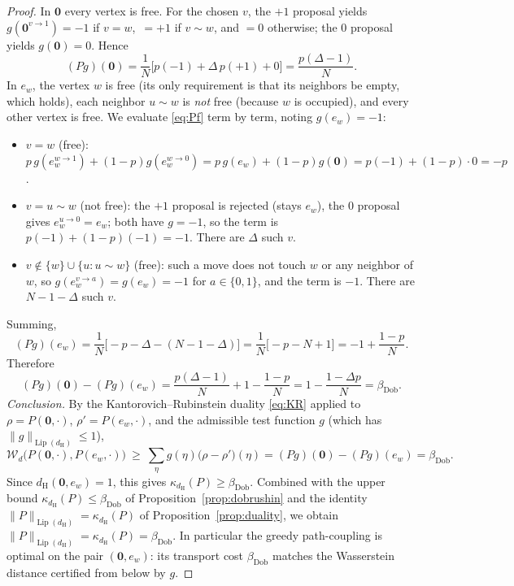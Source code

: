 \documentclass{amsart}
\DeclareMathOperator{\Lip}{Lip}
\newcommand{\Wd}{\mathcal{W}_d}
\begin{document}
\begin{proof}
In $\mathbf 0$ every vertex is free. For the chosen $v$, the $+1$ proposal yields
$g(\mathbf 0^{v\to1})=-1$ if $v=w$, $\,=+1$ if $v\sim w$, and $=0$ otherwise; the
$0$ proposal yields $g(\mathbf 0)=0$. Hence
\[
(Pg)(\mathbf 0)=\frac1N\Big[p(-1)+\Delta\,p(+1)+0\Big]=\frac{p(\Delta-1)}{N}.
\]
In $e_w$, the vertex $w$ is free (its only requirement is that its neighbors be
empty, which holds), each neighbor $u\sim w$ is \emph{not} free (because $w$ is
occupied), and every other vertex is free. We evaluate \eqref{eq:Pf} term by
term, noting $g(e_w)=-1$:
\begin{itemize}
\item $v=w$ (free): $p\,g(e_w^{w\to1})+(1-p)g(e_w^{w\to0})
=p\,g(e_w)+(1-p)g(\mathbf 0)=p(-1)+(1-p)\cdot0=-p$.
\item $v=u\sim w$ (not free): the $+1$ proposal is rejected (stays $e_w$), the
$0$ proposal gives $e_w^{u\to0}=e_w$; both have $g=-1$, so the term is
$p(-1)+(1-p)(-1)=-1$. There are $\Delta$ such $v$.
\item $v\notin\{w\}\cup\{u:u\sim w\}$ (free): such a move does not touch $w$ or
any neighbor of $w$, so $g(e_w^{v\to a})=g(e_w)=-1$ for $a\in\{0,1\}$, and the
term is $-1$. There are $N-1-\Delta$ such $v$.
\end{itemize}
Summing,
\[
(Pg)(e_w)=\frac1N\Big[-p-\Delta-(N-1-\Delta)\Big]
=\frac1N\big[-p-N+1\big]=-1+\frac{1-p}{N}.
\]
Therefore
\[
(Pg)(\mathbf 0)-(Pg)(e_w)
=\frac{p(\Delta-1)}{N}+1-\frac{1-p}{N}
=1-\frac{1-\Delta p}{N}=\beta_{\mathrm{Dob}} .
\]
\emph{Conclusion.} By the Kantorovich--Rubinstein duality \eqref{eq:KR} applied
to $\rho=P(\mathbf 0,\cdot)$, $\rho'=P(e_w,\cdot)$, and the admissible test
function $g$ (which has $\|g\|_{\Lip(d_{\mathrm H})}\le1$),
\[
\Wd\big(P(\mathbf 0,\cdot),P(e_w,\cdot)\big)
\ \ge\ \sum_\eta g(\eta)\big(\rho-\rho'\big)(\eta)
=(Pg)(\mathbf 0)-(Pg)(e_w)=\beta_{\mathrm{Dob}} .
\]
Since $d_{\mathrm H}(\mathbf 0,e_w)=1$, this gives
$\kappa_{d_{\mathrm H}}(P)\ge\beta_{\mathrm{Dob}}$. Combined with the upper bound
$\kappa_{d_{\mathrm H}}(P)\le\beta_{\mathrm{Dob}}$ of
Proposition~\ref{prop:dobrushin} and the identity
$\|P\|_{\Lip(d_{\mathrm H})}=\kappa_{d_{\mathrm H}}(P)$ of
Proposition~\ref{prop:duality}, we obtain
$\|P\|_{\Lip(d_{\mathrm H})}=\kappa_{d_{\mathrm H}}(P)=\beta_{\mathrm{Dob}}$.
In particular the greedy path-coupling is optimal on the pair
$(\mathbf 0,e_w)$: its transport cost $\beta_{\mathrm{Dob}}$ matches the
Wasserstein distance certified from below by $g$.
\end{proof}
\end{document}
